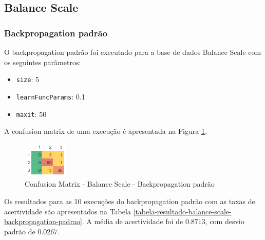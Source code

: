 \subsection{Balance Scale}

\subsubsection{Backpropagation padrão}

O backpropagation padrão foi executado para a base de dados Balance Scale com os seguintes parâmetros:

\begin{itemize}
	\item \texttt{size}: 5
	\item \texttt{learnFuncParams}: 0.1
	\item \texttt{maxit}: 50
\end{itemize}

A confusion matrix de uma execução é apresentada na Figura \ref{figura-confusion-matrix-balance-scale-backpropagation-padrao}.

\begin{figure}[h!]
  \centering
  \includegraphics[width=0.3\linewidth]{figs/confusion-matrix-balance-scale-backpropagation-padrao.png}
  \caption{Confusion Matrix - Balance Scale - Backpropagation padrão}
  \label{figura-confusion-matrix-balance-scale-backpropagation-padrao}
\end{figure}

Os resultados para as 10 execuções do backpropagation padrão com as taxas de acertividade são apresentados na Tabela \ref{tabela-resultado-balance-scale-backpropagation-padrao}. A média de acertividade foi de $0.8713$, com desvio padrão de $0.0267$.

